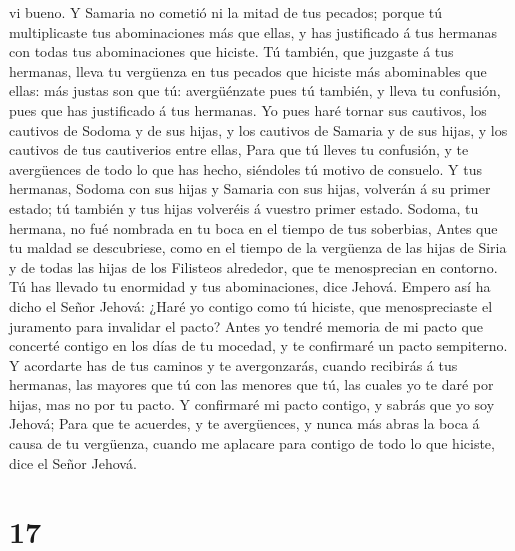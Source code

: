 vi bueno.  Y Samaria no cometió ni la mitad de tus
pecados; porque tú multiplicaste tus abominaciones más que ellas, y has
justificado á tus hermanas con todas tus abominaciones que hiciste.
 Tú también, que juzgaste á tus hermanas, lleva tu
vergüenza en tus pecados que hiciste más abominables que ellas: más
justas son que tú: avergüénzate pues tú también, y lleva tu confusión,
pues que has justificado á tus hermanas.  Yo pues haré
tornar sus cautivos, los cautivos de Sodoma y de sus hijas, y los
cautivos de Samaria y de sus hijas, y los cautivos de tus cautiverios
entre ellas,  Para que tú lleves tu confusión, y te
avergüences de todo lo que has hecho, siéndoles tú motivo de consuelo.
 Y tus hermanas, Sodoma con sus hijas y Samaria con sus
hijas, volverán á su primer estado; tú también y tus hijas volveréis á
vuestro primer estado.  Sodoma, tu hermana, no fué
nombrada en tu boca en el tiempo de tus soberbias,  Antes
que tu maldad se descubriese, como en el tiempo de la vergüenza de las
hijas de Siria y de todas las hijas de los Filisteos alrededor, que te
menosprecian en contorno.  Tú has llevado tu enormidad y
tus abominaciones, dice Jehová.  Empero así ha dicho el
Señor Jehová: ¿Haré yo contigo como tú hiciste, que menospreciaste el
juramento para invalidar el pacto?  Antes yo tendré
memoria de mi pacto que concerté contigo en los días de tu mocedad, y te
confirmaré un pacto sempiterno.  Y acordarte has de tus
caminos y te avergonzarás, cuando recibirás á tus hermanas, las mayores
que tú con las menores que tú, las cuales yo te daré por hijas, mas no
por tu pacto.  Y confirmaré mi pacto contigo, y sabrás
que yo soy Jehová;  Para que te acuerdes, y te
avergüences, y nunca más abras la boca á causa de tu vergüenza, cuando
me aplacare para contigo de todo lo que hiciste, dice el Señor Jehová.

\hypertarget{section-16}{%
\section{17}\label{section-16}}

